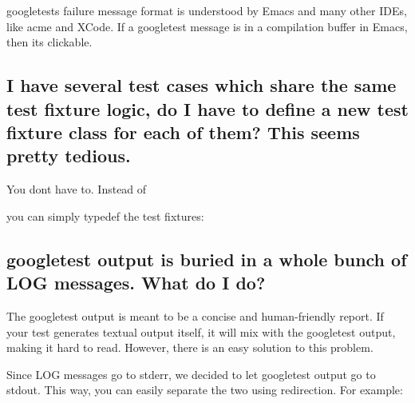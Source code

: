 googletest\textquotesingle{}s failure message format is understood by Emacs and many other I\+D\+Es, like acme and X\+Code. If a googletest message is in a compilation buffer in Emacs, then it\textquotesingle{}s clickable.

\subsection*{I have several test cases which share the same test fixture logic, do I have to define a new test fixture class for each of them? This seems pretty tedious.}

You don\textquotesingle{}t have to. Instead of


\begin{DoxyCode}{0}
\DoxyCodeLine{}
\DoxyCodeLine{}
\DoxyCodeLine{}
\end{DoxyCode}


you can simply {\ttfamily typedef} the test fixtures\+:


\begin{DoxyCode}{0}
\DoxyCodeLine{}
\DoxyCodeLine{}
\DoxyCodeLine{}
\end{DoxyCode}


\subsection*{googletest output is buried in a whole bunch of L\+OG messages. What do I do?}

The googletest output is meant to be a concise and human-\/friendly report. If your test generates textual output itself, it will mix with the googletest output, making it hard to read. However, there is an easy solution to this problem.

Since {\ttfamily L\+OG} messages go to stderr, we decided to let googletest output go to stdout. This way, you can easily separate the two using redirection. For example\+:



